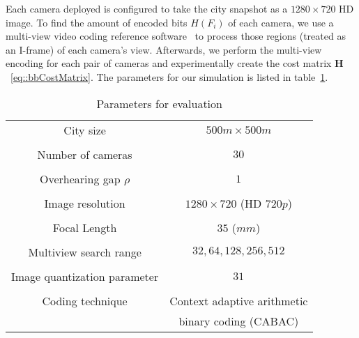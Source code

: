 Each camera deployed is configured to take the city snapshot as a $1280 \times 720$ HD image.
To find the amount of encoded bits $H(F_i)$ of each camera, we use a multi-view video coding reference software~\cite{JMVC} to process those regions (treated as an I-frame) of each camera's view.
Afterwards, we perform the multi-view encoding for each pair of cameras and experimentally create the cost matrix $\mathbf{H}$~\eqref{eq::bbCostMatrix}.
The parameters for our simulation is listed in table~\ref{tab::evaParameters}.
%
\begin{table}[htb]
\footnotesize
\centering
\begin{tabular}{c||c}
  \hline
  City size & $500m \times 500m$ \\ \\
  Number of cameras & $30$ \\ \\
  Overhearing gap $\rho$ & $1$ \\ \\
  Image resolution & $1280 \times 720$ (HD $720p$) \\ \\
  Focal Length & $35$ ($mm$) \\ \\
  Multiview search range & $32,64,128,256,512$ \\ \\
  Image quantization parameter & $31$ \\ \\
  Coding technique & Context adaptive arithmetic \\
                                  & binary coding (CABAC) \\
  \hline
\end{tabular}
\\
\caption{\label{tab::evaParameters}Parameters for evaluation}
\end{table}

%
